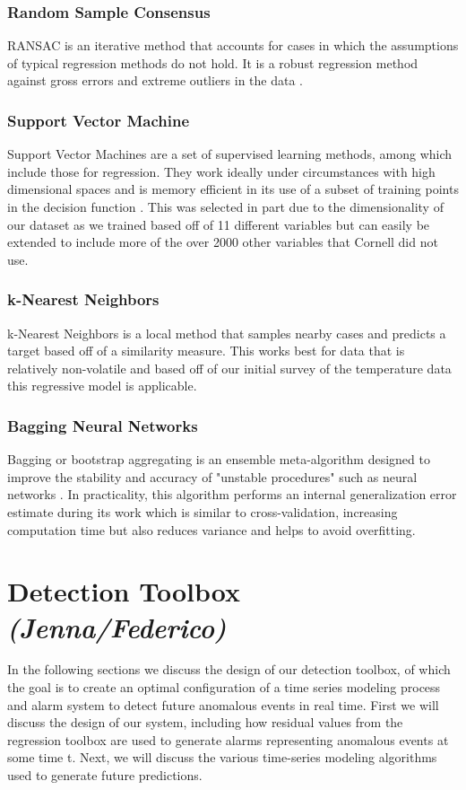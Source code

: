 \documentclass{acm_proc_article-sp}
\begin{document}
\subsubsection{Random Sample Consensus}
RANSAC is an iterative method that accounts for cases in which the assumptions of typical regression methods do not hold. It is a robust regression method against gross errors and extreme outliers in the data \cite{Cornell}.

\subsubsection{Support Vector Machine}
Support Vector Machines are a set of supervised learning methods, among which include those for regression. They work ideally under circumstances with high dimensional spaces and is memory efficient in its use of a subset of training points in the decision function \cite{svm}. This was selected in part due to the dimensionality of our dataset as we trained based off of 11 different variables but can easily be extended to include more of the over 2000 other variables that Cornell did not use. 

\subsubsection{k-Nearest Neighbors}
k-Nearest Neighbors is a local method that samples nearby cases and predicts a target based off of a similarity measure. This works best for data that is relatively non-volatile and based off of our initial survey of the temperature data this regressive model is applicable.

\subsubsection{Bagging Neural Networks}
Bagging or bootstrap aggregating is an ensemble meta-algorithm designed to improve the stability and accuracy of "unstable procedures" such as neural networks \cite{Breiman96baggingpredictors}. In practicality, this algorithm performs an internal generalization error estimate during its work which is similar to cross-validation, increasing computation time but also reduces variance and helps to avoid overfitting.

\newpage
\section{Detection Toolbox \textit{(Jenna/Federico)}}
In the following sections we discuss the design of our detection toolbox, of which the goal is to create an optimal configuration of a time series modeling process and alarm system to detect future anomalous events in real time. First we will discuss the design of our system, including how residual values from the regression toolbox are used to generate alarms representing anomalous events at some time t. Next, we will discuss the various time-series modeling algorithms used to generate future predictions.
\end{document}
